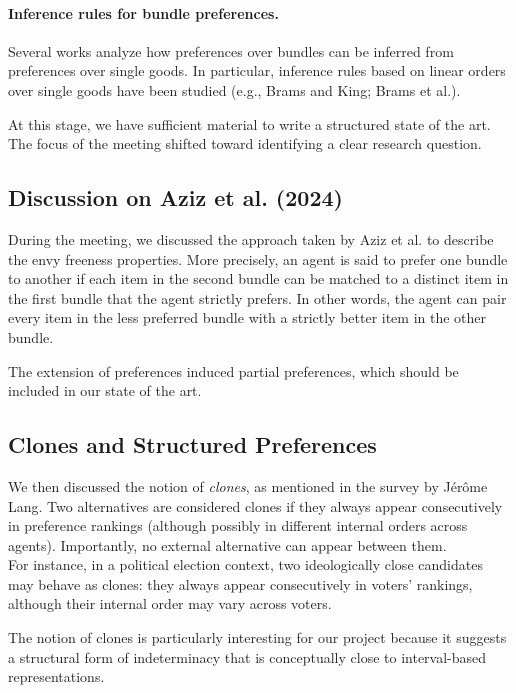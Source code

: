 \documentclass{article}
\begin{document}
\paragraph{Inference rules for bundle preferences.}
Several works analyze how preferences over bundles can be inferred from preferences over single goods. In particular, inference rules based on linear orders over single goods have been studied (e.g., Brams and King; Brams et al.).

At this stage, we have sufficient material to write a structured state of the art. The focus of the meeting shifted toward identifying a clear research question.

\subsection*{Discussion on Aziz et al. (2024)}

During the meeting, we discussed the approach taken by Aziz et al. to describe the envy freeness properties. 
More precisely, an agent is said to prefer one bundle to another if each item in the second bundle can be matched to a distinct item in the first bundle that the agent strictly prefers. 
In other words, the agent can pair every item in the less preferred bundle with a strictly better item in the other bundle.

The extension of preferences induced partial preferences, which should be included in our state of the art.

\subsection*{Clones and Structured Preferences}

We then discussed the notion of \textit{clones}, as mentioned in the survey by Jérôme Lang.
Two alternatives are considered clones if they always appear consecutively in preference rankings (although possibly in different internal orders across agents).
Importantly, no external alternative can appear between them.
\\For instance, in a political election context, two ideologically close candidates may behave as clones: they always appear consecutively in voters’ rankings, although their internal order may vary across voters.

The notion of clones is particularly interesting for our project because it suggests a structural form of indeterminacy that is conceptually close to interval-based representations.
\end{document}
